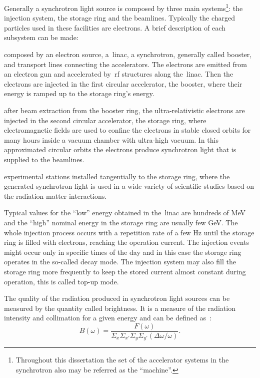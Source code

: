 Generally a synchrotron light source is composed by three main systems\footnote{Throughout this dissertation the set of the accelerator systems in the synchrotron also may be referred as the ``machine''.}: the injection system, the storage ring and the beamlines. Typically the charged particles used in these facilities are electrons. A brief description of each subsystem can be made:
\begin{description}[align=left]
    \item[Injection system:] composed by an electron source, a~\gls{linac}, a synchrotron, generally called booster, and transport lines connecting the accelerators. The electrons are emitted from an electron gun and accelerated by~\gls{rf} structures along the~\gls{linac}. Then the electrons are injected in the first circular accelerator, the booster, where their energy is ramped up to the storage ring's energy.
    \item[Storage ring:] after beam extraction from the booster ring, the ultra-relativistic electrons are injected in the second circular accelerator, the storage ring, where electromagnetic fields are used to confine the electrons in stable closed orbits for many hours inside a vacuum chamber with ultra-high vacuum. In this approximated circular orbits the electrons produce synchrotron light that is supplied to the beamlines.
    \item[Beamlines:] experimental stations installed tangentially to the storage ring, where the generated synchrotron light is used in a wide variety of scientific studies based on the radiation-matter interactions.
\end{description}

Typical values for the ``low'' energy obtained in the~\gls{linac} are hundreds of \si{\mega\electronvolt} and the ``high'' nominal energy in the storage ring are usually few \si{\giga\electronvolt}. The whole injection process occurs with a repetition rate of a few \si{\hertz} until the storage ring is filled with electrons, reaching the operation current. The injection events might occur only in specific times of the day and in this case the storage ring operates in the so-called decay mode. The injection system may also fill the storage ring more frequently to keep the stored current almost constant during operation, this is called top-up mode.

The quality of the radiation produced in synchrotron light sources can be measured by the quantity called brightness. It is a measure of the radiation intensity and collimation for a given energy and can be defined as~\cite{huang2013}:
\begin{equation}
    B(\omega) = \dfrac{F(\omega)}{\Sigma_x \Sigma_{x'} \Sigma_y \Sigma_{y'} \left(\Delta \omega /\omega\right)}.
\end{equation}

